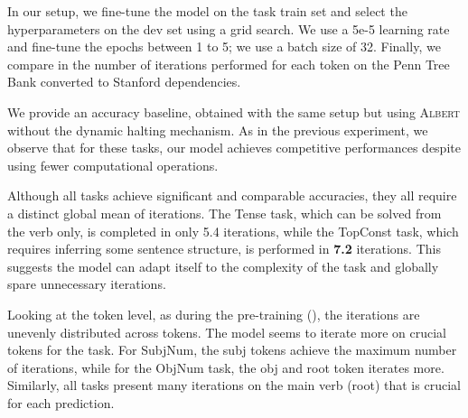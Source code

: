 In our setup, we fine-tune the model on the task train set and select the hyperparameters on the dev set using a grid search. We use a 5e-5 learning rate and fine-tune the epochs between 1 to 5; we use a batch size of 32.
Finally, we %
compare in  the number of iterations performed for each token 
on the Penn Tree Bank \parencite{marcus_94} converted to Stanford dependencies.

We provide an accuracy baseline, obtained with the same setup but using \textsc{Albert}  without the dynamic halting mechanism. As in the previous experiment, we observe that for these tasks, our model achieves competitive performances despite using fewer computational operations.

Although all tasks achieve significant and comparable accuracies, they all require a distinct global mean of iterations. The Tense task, which can be solved from the verb only, is completed in only 5.4 iterations, while the TopConst task, which requires inferring some sentence structure, is performed in \textbf{7.2} iterations. This suggests the model can adapt itself to the complexity of the task and globally spare unnecessary iterations. 

Looking at the token level, as during the pre-training (), the iterations are unevenly distributed across tokens. The model seems to iterate more on crucial tokens for the task. For SubjNum, the subj tokens achieve the maximum number of iterations, while for the ObjNum task, the obj and root token iterates more. Similarly, all tasks present many iterations on the main verb (root) that is crucial for each prediction.

